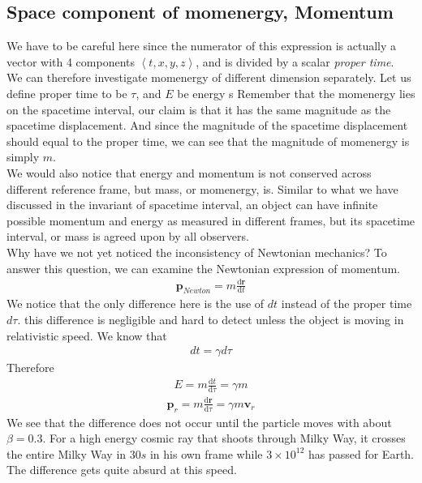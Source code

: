 \documentclass[12pt]{book}
\newcommand{\dydx}[2]{\frac{\text{d} #1}{\text{d} #2}}
\newcommand{\tribkt}[1]{\left< #1 \right>}
\begin{document}
\subsection{Space component of momenergy, Momentum}
We have to be careful here since the numerator of this expression is actually a vector with 4 components $\tribkt{t,x,y,z}$, and is divided by a scalar \textit{proper time}.\\
\newline
We can therefore investigate momenergy of different dimension separately. Let us define proper time to be $\tau$, and $E$ be energy
s
Remember that the momenergy lies on the spacetime interval, our claim is that it has the same magnitude as the spacetime displacement. And since the magnitude of the spacetime displacement should equal to the proper time, we can see that the magnitude of momenergy is simply $\textit{m}$.
\\
\newline
We would also notice that energy and momentum is not conserved across different reference frame, but mass, or momenergy, is. Similar to what we have discussed in the invariant of spacetime interval, an object can have infinite possible momentum and energy as measured in different frames, but its spacetime interval, or mass is agreed upon by all observers. \\
\newline
Why have we not yet noticed the inconsistency of Newtonian mechanics? To answer this question, we can examine the Newtonian expression of momentum. 
\begin{align}
\textbf{p}_{Newton} = m\dydx{\textbf{r}}{t}
\end{align}
We notice that the only difference here is the use of $dt$ instead of the proper time $d\tau$. this difference is negligible and hard to detect unless the object is moving in relativistic speed. We know that 
\begin{align}
dt = \gamma d\tau
\end{align}
Therefore 
\begin{align}
E = m \dydx{t}{\tau} = \gamma m
\end{align}
\begin{align}
\textbf{p}_r = m\dydx{\textbf{r}}{\tau} = \gamma m\textbf{v}_r
\end{align}
We see that the difference does not occur until the particle moves with about $\beta=0.3$. For a high energy cosmic ray that shoots through Milky Way, it crosses the entire Milky Way in $30s$ in his own frame while $3\times 10^{12}$ has passed for Earth. The difference gets quite absurd at this speed. 
\end{document}
